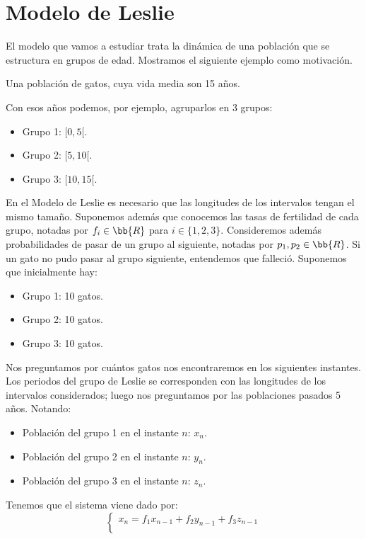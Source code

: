 \section{Modelo de Leslie}
El modelo que vamos a estudiar trata la dinámica de una población que se estructura en grupos de edad. Mostramos el siguiente ejemplo como motivación.
\begin{ejemplo}
    Una población de gatos, cuya vida media son 15 años.

    Con esos años podemos, por ejemplo, agruparlos en 3 grupos:
    \begin{itemize}
        \item Grupo 1: $[0,5[$.
        \item Grupo 2: $[5,10[$.
        \item Grupo 3: $[10,15[$.
    \end{itemize}
    En el Modelo de Leslie es necesario que las longitudes de los intervalos tengan el mismo tamaño. Suponemos además que conocemos las tasas de fertilidad de cada grupo, notadas por $f_i\in \bb{R}$ para $i\in \{1,2,3\}$. Consideremos además probabilidades de pasar de un grupo al siguiente, notadas por $p_1,p_2\in \bb{R}$. Si un gato no pudo pasar al grupo siguiente, entendemos que falleció. Suponemos que inicialmente hay:
    \begin{itemize}
        \item Grupo 1: 10 gatos.
        \item Grupo 2: 10 gatos.
        \item Grupo 3: 10 gatos.
    \end{itemize}
    Nos preguntamos por cuántos gatos nos encontraremos en los siguientes instantes. Los periodos del grupo de Leslie se corresponden con las longitudes de los intervalos considerados; luego nos preguntamos por las poblaciones pasados 5 años. Notando:
    \begin{itemize}
        \item Población del grupo 1 en el instante $n$: $x_n$.
        \item Población del grupo 2 en el instante $n$: $y_n$.
        \item Población del grupo 3 en el instante $n$: $z_n$.
    \end{itemize}
    Tenemos que el sistema viene dado por:
    \begin{equation*}
        \left\{\begin{array}{l}
            x_n = f_1x_{n-1} + f_2 y_{n-1} + f_3 z_{n-1} \\

\end{array}
\end{equation*}
\end{ejemplo}
